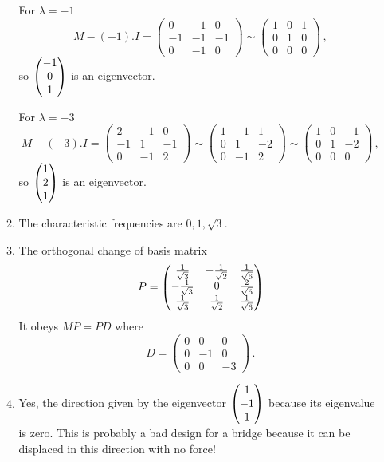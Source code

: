 \begin{enumerate}
\begin{enumerate}
For $\lambda=-1$
\[
M-(-1).I=\begin{pmatrix}0&-1&0\\-1&-1&-1\\0&-1&0\end{pmatrix}\sim\begin{pmatrix}1&0&1\\0&1&0\\0&0&0\end{pmatrix}
\, ,
\]
so $\begin{pmatrix} -1\\0\\1 \end{pmatrix}$ is an eigenvector.

For $\lambda=-3$
\[
M-(-3).I=\begin{pmatrix}2&-1&0\\-1&1&-1\\0&-1&2\end{pmatrix}\sim\begin{pmatrix}1&-1&1\\0&1&-2\\0&-1&2\end{pmatrix}
\sim\begin{pmatrix}1&0&-1\\0&1&-2\\0&0&0\end{pmatrix}\, ,
\]
so $\begin{pmatrix} 1\\2\\1 \end{pmatrix}$ is an eigenvector.

\item The characteristic frequencies are $0,1,\sqrt{3}$.
\item The orthogonal change of basis matrix 
\[
P=\begin{pmatrix}
\frac1{\sqrt{3}}&-\frac1{\sqrt{2}}&\frac{1}{\sqrt{6}}\\
-\frac1{\sqrt{3}}&\mc 0&\frac{2}{\sqrt{6}}\\
\frac1{\sqrt{3}}&\frac1{\sqrt{2}}&\frac{1}{\sqrt{6}}
\end{pmatrix}
\]
It obeys $MP=PD$ where
\[
D=\begin{pmatrix}0&0&0\\0&-1&0\\0&0&-3\end{pmatrix}\, .
\]
\item Yes, the direction given by the eigenvector $\begin{pmatrix} 1\\-1\\1 \end{pmatrix}$ because its eigenvalue is zero. This is probably a bad design for a bridge because it can be displaced in this direction with no force!
\end{enumerate}


\end{enumerate}
